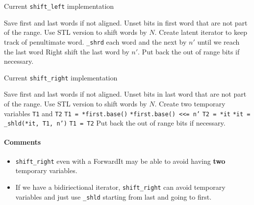 \documentclass[letterpaper, 8pt, twocolumn]{article}
\begin{document}
\begin{algorithm}[H]
    \caption{Current \texttt{shift\_left} implementation}
    \begin{algorithmic}[1]
            \State Save first and last words if not aligned.
            \State Unset bits in first word that are not part of 
            the range.
            \State Use STL version to shift words by $N$.
            \State Create latent iterator to keep track of penultimate word.
            \State \texttt{\_shrd} each word and the next by $n'$ until we 
            reach the last word
            \State Right shift the last word by $n'$.
            \State Put back the out of range bits if necessary.
        \EndFunction
    \end{algorithmic}
\end{algorithm}

\begin{algorithm}[H]
    \caption{Current \texttt{shift\_right} implementation}
    \begin{algorithmic}[1]
            \State Save first and last words if not aligned.
            \State Unset bits in last word that are not part of 
            the range.
            \State Use STL version to shift words by $N$.
            \State Create two temporary variables \texttt{T1} and \texttt{T2}
            \State \texttt{T1 = *first.base()}
            \State \texttt{*first.base() <<= n'}
                \State \texttt{T2 = *it}
                \State \texttt{*it = \_shld(*it, T1, n')}
                \State \texttt{T1 = T2}
            \EndFor
            \State Put back the out of range bits if necessary.
        \EndFunction
    \end{algorithmic}
\end{algorithm}

\paragraph{Comments}
\begin{itemize}
    \item \texttt{shift\_right} even with a ForwardIt may be able to avoid
        having \textbf{two} temporary variables.
    \item If we have a bidiriectional iterator, \texttt{shift\_right} 
        can avoid temporary variables and just use \texttt{\_shld} starting 
        from last and going to first.
\end{itemize}

\end{document}
